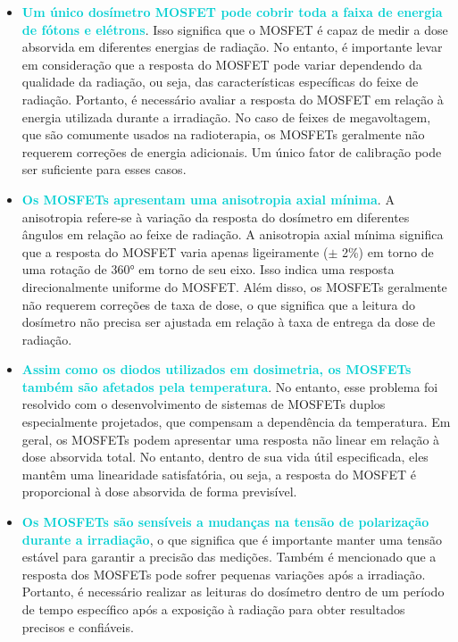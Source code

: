 \documentclass[11pt,a4paper]{article}
\newcounter{exemplo}
\begin{document}
	\begin{exemplo}
		\begin{itemize}
			\item \textcolor{DarkTurquoise}{\textbf{Um único dosímetro MOSFET pode cobrir toda a faixa de energia de fótons e elétrons}}. Isso significa que o MOSFET é capaz de medir a dose absorvida em diferentes energias de radiação. No entanto, é importante levar em consideração que a resposta do MOSFET pode variar dependendo da qualidade da radiação, ou seja, das características específicas do feixe de radiação. Portanto, é necessário avaliar a resposta do MOSFET em relação à energia utilizada durante a irradiação. No caso de feixes de megavoltagem, que são comumente usados na radioterapia, os MOSFETs geralmente não requerem correções de energia adicionais. Um único fator de calibração pode ser suficiente para esses casos.
			\item \textcolor{DarkTurquoise}{\textbf{Os MOSFETs apresentam uma anisotropia axial mínima}}. A anisotropia refere-se à variação da resposta do dosímetro em diferentes ângulos em relação ao feixe de radiação. A anisotropia axial mínima significa que a resposta do MOSFET varia apenas ligeiramente ($\pm$ 2\%) em torno de uma rotação de \ang{360} em torno de seu eixo. Isso indica uma resposta direcionalmente uniforme do MOSFET. Além disso, os MOSFETs geralmente não requerem correções de taxa de dose, o que significa que a leitura do dosímetro não precisa ser ajustada em relação à taxa de entrega da dose de radiação.
			\item \textcolor{DarkTurquoise}{\textbf{Assim como os diodos utilizados em dosimetria, os MOSFETs também são afetados pela temperatura}}. No entanto, esse problema foi resolvido com o desenvolvimento de sistemas de MOSFETs duplos especialmente projetados, que compensam a dependência da temperatura. Em geral, os MOSFETs podem apresentar uma resposta não linear em relação à dose absorvida total. No entanto, dentro de sua vida útil especificada, eles mantêm uma linearidade satisfatória, ou seja, a resposta do MOSFET é proporcional à dose absorvida de forma previsível.
			\item \textcolor{DarkTurquoise}{\textbf{Os MOSFETs são sensíveis a mudanças na tensão de polarização durante a irradiação}}, o que significa que é importante manter uma tensão estável para garantir a precisão das medições. Também é mencionado que a resposta dos MOSFETs pode sofrer pequenas variações após a irradiação. Portanto, é necessário realizar as leituras do dosímetro dentro de um período de tempo específico após a exposição à radiação para obter resultados precisos e confiáveis.
		\end{itemize}
	\end{exemplo}
\end{document}
